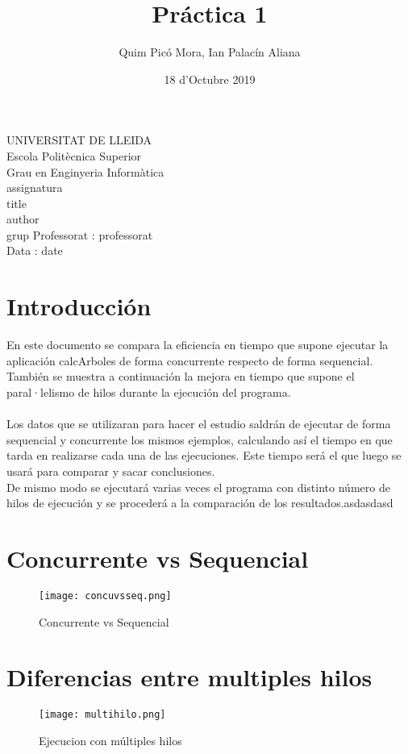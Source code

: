 \documentclass{article}
\title{Práctica 1}
\author{Quim Picó Mora, Ian Palacín Aliana}
\date{18 d'Octubre 2019}
\renewcommand{\maketitle}{ %
	\begin{titlepage}
		\raggedright{UNIVERSITAT DE LLEIDA \\
			Escola Politècnica Superior \\
			Grau en Enginyeria Informàtica\\
			\1assignatura\\}
		\vspace{5cm}
		\centering\huge{\5title \\}
		\vspace{3cm}
		\large{\6author} \\
		\normalsize{\3grup}
		\vfill
		Professorat : \4professorat \\
		Data : \7date
\end{titlepage}}
\begin{document}
	\maketitle
	\thispagestyle{empty}
	
	\newpage
	\tableofcontents
	\newpage
	




\section{Introducción}

En este documento se compara la eficiencia en tiempo que supone ejecutar la aplicación calcArboles de forma concurrente respecto de forma sequencial. También se muestra a continuación la mejora en tiempo que supone el paral·lelismo de hilos durante la ejecución del programa.
\\\\
Los datos que se utilizaran para hacer el estudio saldrán de ejecutar de forma sequencial y concurrente los mismos ejemplos, calculando así el tiempo en que tarda en realizarse cada una de las ejecuciones. Este tiempo será el que luego se usará para comparar y sacar conclusiones.\\
De mismo modo se ejecutará varias veces el programa con distinto número de hilos de ejecución y se procederá a la comparación de los resultados.asdasdasd


\section{Concurrente vs Sequencial}

\begin{figure}[hbt!]
  \texttt{[image: concuvsseq.png]}
  \caption{Concurrente vs Sequencial}
  \label{fig:convsseq}
\end{figure}
\newpage

\section{Diferencias entre multiples hilos}
\begin{figure}[hbt!]
  \texttt{[image: multihilo.png]}
  \caption{Ejecucion con múltiples hilos}
  \label{fig:multhilos}
\end{figure}
\end{document}
